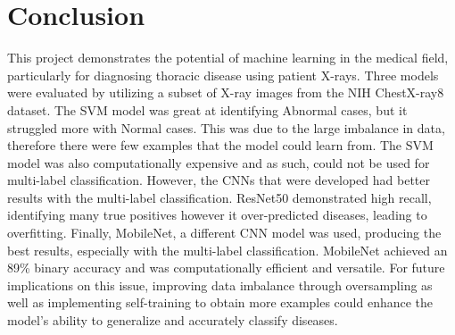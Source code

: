 \documentclass{article}
\theoremstyle{plain}
\theoremstyle{definition}
\theoremstyle{remark}
\begin{document}
\section{Conclusion}
This project demonstrates the potential of machine learning in the medical field, particularly for
diagnosing thoracic disease using patient X-rays. Three models were evaluated by utilizing a subset of
X-ray images from the NIH ChestX-ray8 dataset. The SVM model was great at
identifying Abnormal cases, but it struggled more with Normal cases. This was due to the large
imbalance in data, therefore there were few examples that the model could learn from. The SVM
model was also computationally expensive and as such, could not be used for multi-label
classification. However, the CNNs that were developed had better results with the multi-label
classification. ResNet50 demonstrated high recall, identifying many true positives however it
over-predicted diseases, leading to overfitting. Finally, MobileNet, a different CNN model was used,
producing the best results, especially with the multi-label classification. MobileNet
achieved an 89\% binary accuracy and was computationally efficient and versatile. For future
implications on this issue, improving data imbalance through oversampling as well as
implementing self-training to obtain more examples could enhance the model's ability to
generalize and accurately classify diseases.




\nocite{jbrownlee}
\nocite{fchollet}
\nocite{mobilenet}
\nocite{svm}
\nocite{tensorflow}
\nocite{athakur}
\nocite{chestx-ray}
\nocite{cnn}




\clearpage
{}
\end{document}
